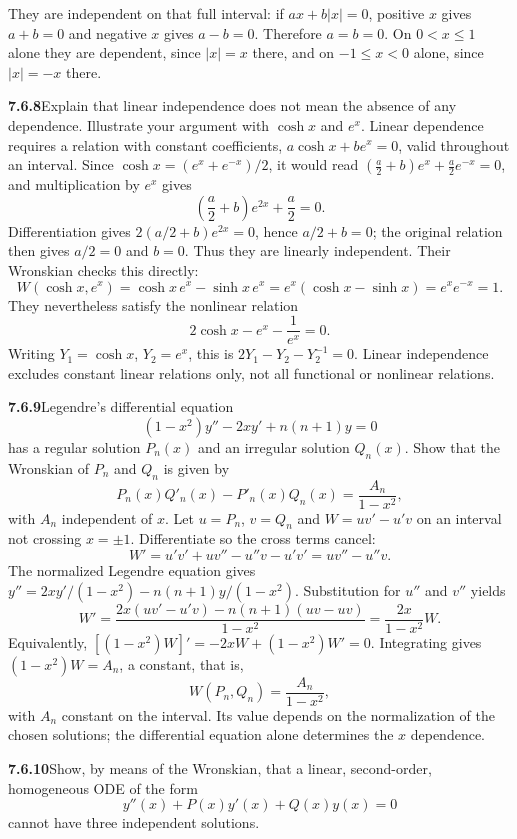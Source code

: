 They are independent on that full interval: if $ax+b|x|=0$, positive
$x$ gives $a+b=0$ and negative $x$ gives $a-b=0$. Therefore
$a=b=0$. On $0<x\le1$ alone they are dependent, since $|x|=x$ there,
and on $-1\le x<0$ alone, since $|x|=-x$ there.

\par\bigskip
\noindent\textbf{7.6.8}\quad Explain that linear independence does not mean
the absence of any dependence. Illustrate your argument with $\cosh x$ and
$e^{x}$.
\solution
Linear dependence requires a relation with constant coefficients,
$a\cosh x+be^x=0$, valid throughout an interval. Since
$\cosh x=(e^x+e^{-x})/2$, it would read
$(\frac a2+b)e^x+\frac a2e^{-x}=0$, and multiplication by $e^x$ gives
\[
\left(\frac a2+b\right)e^{2x}+\frac a2=0.
\]
Differentiation gives $2(a/2+b)e^{2x}=0$, hence $a/2+b=0$;
the original relation then gives $a/2=0$ and $b=0$. Thus they are
linearly independent. Their Wronskian checks this directly:
\[
W(\cosh x,e^x)=\cosh x\,e^x-\sinh x\,e^x=e^x(\cosh x-\sinh x)
=e^xe^{-x}=1.
\]
They nevertheless satisfy the nonlinear relation
\[
\boxed{2\cosh x-e^x-\frac1{e^x}=0}.
\]
Writing $Y_1=\cosh x$, $Y_2=e^x$, this is
$2Y_1-Y_2-Y_2^{-1}=0$. Linear independence excludes constant linear
relations only, not all functional or nonlinear relations.

\par\bigskip
\noindent\textbf{7.6.9}\quad Legendre's differential equation
\[
(1-x^{2})y''-2xy'+n(n+1)y=0
\]
has a regular solution $P_{n}(x)$ and an irregular solution $Q_{n}(x)$. Show
that the Wronskian of $P_{n}$ and $Q_{n}$ is given by
\[
P_{n}(x)Q'_{n}(x)-P'_{n}(x)Q_{n}(x)=\frac{A_{n}}{1-x^{2}},
\]
with $A_{n}$ independent of $x$.
\solution
Let $u=P_n$, $v=Q_n$ and $W=uv'-u'v$ on an interval not crossing
$x=\pm1$. Differentiate so the cross terms cancel:
\[
W'=u'v'+uv''-u''v-u'v'=uv''-u''v.
\]
The normalized Legendre equation gives
$y''=2xy'/(1-x^2)-n(n+1)y/(1-x^2)$. Substitution for $u''$ and $v''$
yields
\[
W'=\frac{2x(uv'-u'v)-n(n+1)(uv-uv)}{1-x^2}=\frac{2x}{1-x^2}W.
\]
Equivalently,
$[(1-x^2)W]'=-2xW+(1-x^2)W'=0$. Integrating gives $(1-x^2)W=A_n$, a
constant, that is,
\[
\boxed{W(P_n,Q_n)=\frac{A_n}{1-x^2}},
\]
with $A_n$ constant on the interval. Its value depends on the
normalization of the chosen solutions; the differential equation alone
determines the $x$ dependence.

\par\bigskip
\noindent\textbf{7.6.10}\quad Show, by means of the Wronskian, that a linear,
second-order, homogeneous ODE of the form
\[
y''(x)+P(x)y'(x)+Q(x)y(x)=0
\]
cannot have three independent solutions.

